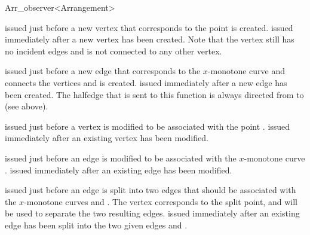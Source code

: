\begin{ccRefClass}{Arr_observer<Arrangement>}


    {issued just before a new vertex that corresponds to the point 
     is created.}
\ccGlue
{}
    {issued immediately after a new vertex  has been created.
     Note that the vertex still has no incident edges and is not connected
     to any other vertex.}

    {issued just before a new edge that corresponds to the $x$-monotone curve 
      and connects the vertices  and  is created.}
\ccGlue
{}
    {issued immediately after a new edge  has been created.
     The halfedge that is sent to this function is always directed from 
      to  (see above).}

    {issued just before a vertex  is modified to be associated with
     the point .}
\ccGlue
{}
    {issued immediately after an existing vertex  has been modified.}

    {issued just before an edge  is modified to be associated with
     the $x$-monotone curve .}
\ccGlue
{}
    {issued immediately after an existing edge  has been modified.}

    {issued just before an edge  is split into two edges that should
     be associated with the $x$-monotone curves  and . The
     vertex  corresponds to the split point, and will be used to
     separate the two resulting edges.}
\ccGlue
{}
    {issued immediately after an existing edge has been split into the two
     given edges  and .}


\end{ccRefClass}
